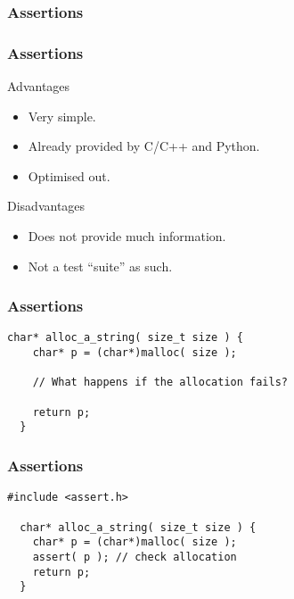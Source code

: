 \begin{frame}
  \frametitle{Assertions}
\end{frame}

\begin{frame}
  \frametitle{Assertions}
  \begin{block}{Advantages}
    \begin{itemize}
    \item Very simple.
    \item Already provided by C/C++ and Python.
    \item Optimised out.
    \end{itemize}
  \end{block}
  \begin{block}{Disadvantages}
    \begin{itemize}
    \item Does not provide much information.
    \item Not a test ``suite'' as such.
    \end{itemize}
  \end{block}
\end{frame}

\begin{frame}[fragile]
  \frametitle{Assertions}
  \begin{example}
    \begin{lstlisting}[style=C]
  char* alloc_a_string( size_t size ) {
    char* p = (char*)malloc( size );

    // What happens if the allocation fails?

    return p;
  }
    \end{lstlisting}
  \end{example}
\end{frame}

\begin{frame}[fragile]
  \frametitle{Assertions}
  \begin{example}
    \begin{lstlisting}[style=C]
  #include <assert.h>

  char* alloc_a_string( size_t size ) {
    char* p = (char*)malloc( size );
    assert( p ); // check allocation
    return p;
  }
    \end{lstlisting}
  \end{example}
\end{frame}

